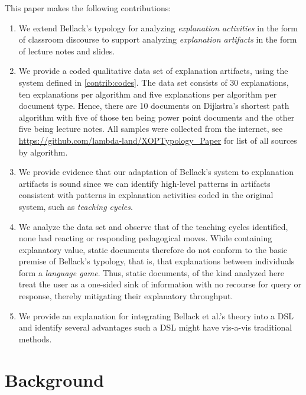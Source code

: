 \documentclass[conference]{IEEEtran}
\begin{document}
This paper makes the following contributions:
%
\begin{enumerate}[C1.]

\item \label{contrib:codes}
%
We extend Bellack's typology for analyzing \emph{explanation activities} in the
form of classroom discourse to support analyzing \emph{explanation artifacts}
in the form of lecture notes and slides.

\item \label{contrib:data}
%
We provide a coded qualitative data set of explanation artifacts, using the
system defined in \ref{contrib:codes}. The data set consists of 30
explanations, ten explanations per algorithm and five explanations per algorithm
per document type. Hence, there are 10 documents on Dijkstra's shortest
path algorithm with five of those ten being power point documents and the other
five being lecture notes. All samples were collected from the internet, see
\url{https://github.com/lambda-land/XOPTypology_Paper} for list of all sources
by algorithm. 

\item \label{contrib:valid}
%
We provide evidence that our adaptation of Bellack's system to explanation
artifacts is sound since we can identify high-level patterns in artifacts
consistent with patterns in explanation activities coded in the original
system, such as \emph{teaching cycles}.

\item \label{contrib:valid}
%
We analyze the data set and observe that of the teaching cycles identified, none
had reacting or responding pedagogical moves. While containing explanatory
value, static documents therefore do not conform to the basic premise of Bellack's
typology, that is, that explanations between individuals form a \emph{language
  game}. Thus, static documents, of the kind analyzed here treat the user as a
one-sided sink of information with no recourse for query or response, thereby
mitigating their explanatory throughput.

\item \label{contrib:dsl}
We provide an explanation for integrating Bellack et al.'s theory into a DSL and
identify several advantages such a DSL might have vis-a-vis traditional methods. 
\end{enumerate}


\section{Background}
\label{sec:back}
\end{document}
